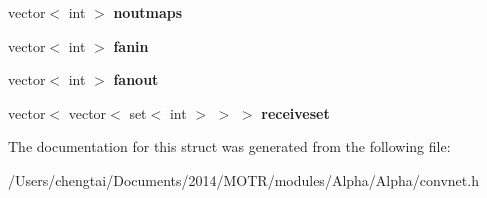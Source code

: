 \begin{DoxyCompactItemize}
\item 
\hypertarget{struct_config_aaf27c312f04beab28bc22e19f6ef491c}{vector$<$ int $>$ {\bfseries noutmaps}}\label{struct_config_aaf27c312f04beab28bc22e19f6ef491c}

\item 
\hypertarget{struct_config_a19155994c41ee4d6d35cfe074eb43899}{vector$<$ int $>$ {\bfseries fanin}}\label{struct_config_a19155994c41ee4d6d35cfe074eb43899}

\item 
\hypertarget{struct_config_a7f0e97476e3abef84295d7a622c8cac4}{vector$<$ int $>$ {\bfseries fanout}}\label{struct_config_a7f0e97476e3abef84295d7a622c8cac4}

\item 
\hypertarget{struct_config_a9146013cb6b61aba1eaecb830d1ae84e}{vector$<$ vector$<$ set$<$ int $>$ $>$ $>$ {\bfseries receiveset}}\label{struct_config_a9146013cb6b61aba1eaecb830d1ae84e}

\end{DoxyCompactItemize}


The documentation for this struct was generated from the following file\+:\begin{DoxyCompactItemize}
\item 
/\+Users/chengtai/\+Documents/2014/\+M\+O\+T\+R/modules/\+Alpha/\+Alpha/convnet.\+h\end{DoxyCompactItemize}
